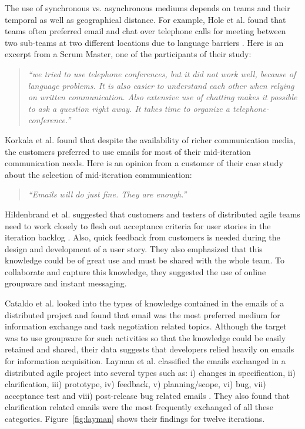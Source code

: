 The use of synchronous vs. asynchronous mediums depends on teams and their temporal as well as geographical distance. For example, Hole et al. found that teams often preferred email and chat over telephone calls for meeting between two sub-teams at two different locations due to language barriers \cite{a_case_study_of}. Here is an excerpt from a Scrum Master, one of the participants of their study:\\

\begin{quote}
\emph{``we tried to use telephone conferences, but it did not work well, because of language problems. It is also easier to understand each other when relying on written communication. Also extensive use of chatting makes it possible to ask a question right away. It takes time to organize a telephone-conference.''}
\end{quote}

Korkala et al. found that despite the availability of richer communication media, the customers preferred to use emails for most of their mid-iteration communication needs\cite{communication_in_distributed}. Here is an opinion from a customer of their case study about the selection of mid-iteration communication:\\
\begin{quote}
\emph{``Emails will do just fine. They are enough.''}
\end{quote}

Hildenbrand et al. suggested that customers and testers of distributed agile teams need to work closely to flesh out acceptance criteria for user stories in the iteration backlog \cite{agile_methods}. Also, quick feedback from customers is needed during the design and development of a user story. They also emphasized that this knowledge could be of great use and must be shared with the whole team. To collaborate and capture this knowledge, they suggested the use of online groupware and instant messaging.

Cataldo et al. looked into the types of knowledge contained in the emails of a distributed project and found that email was the most preferred medium for information exchange and task negotiation related topics\cite{on_coord}. Although the target was to use groupware for such activities so that the knowledge could be easily retained and shared, their data suggests that developers relied heavily on emails for information acquisition. Layman et al. classified the emails exchanged in a distributed agile project into several types such as: i) changes in specification, ii) clarification, iii) prototype, iv) feedback, v) planning/scope, vi) bug, vii) acceptance test and viii) post-release bug related emails \cite{essential_communication}. They also found that clarification related emails were the most frequently exchanged of all these categories. Figure~\ref{fig:layman} shows their findings for twelve iterations.

